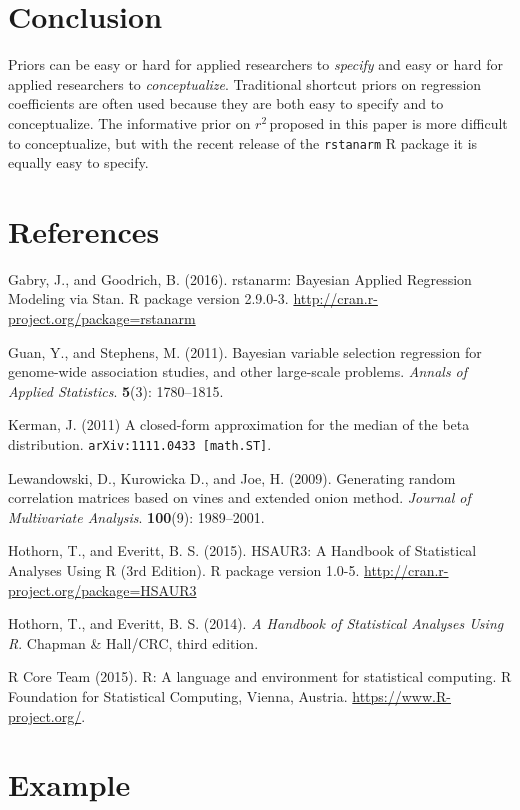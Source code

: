 \documentclass[11pt]{article}
\newcommand{\Rsq}{$r^2\,$}
\begin{document}
\section{Conclusion}

Priors can be easy or hard for applied researchers to \emph{specify} and easy or
hard for applied researchers to \emph{conceptualize}. Traditional shortcut
priors on regression coefficients are often used because they are both easy to
specify and to conceptualize. The informative prior on \Rsq proposed in this
paper is more difficult to conceptualize, but with the recent release of the
{\tt rstanarm} R package it is equally easy to specify.


\section*{References}

\noindent

\bibitem Gabry, J., and Goodrich, B. (2016). rstanarm: Bayesian Applied
Regression Modeling via Stan. R package version 2.9.0-3.
\url{http://cran.r-project.org/package=rstanarm}

\bibitem Guan, Y., and Stephens, M. (2011). Bayesian variable selection
regression for genome-wide association studies, and other large-scale problems.
\emph{Annals of Applied Statistics}. {\bf 5}(3): 1780--1815.

\bibitem Kerman, J. (2011) A closed-form approximation for the median of the
beta distribution. {\tt arXiv:1111.0433 [math.ST]}.

\bibitem Lewandowski, D., Kurowicka D., and Joe, H. (2009). Generating random
correlation matrices based on vines and extended onion method.
\emph{Journal of Multivariate Analysis}. {\bf 100}(9): 1989--2001.

\bibitem Hothorn, T., and Everitt, B. S. (2015).  HSAUR3: A Handbook of
Statistical Analyses Using R (3rd Edition). R package version 1.0-5.
\url{http://cran.r-project.org/package=HSAUR3}

\bibitem Hothorn, T., and Everitt, B. S. (2014). \emph{A Handbook of
Statistical Analyses Using R}. Chapman \& Hall/CRC, third edition.

\bibitem R Core Team (2015). R: A language and environment for statistical
computing. R Foundation for Statistical Computing, Vienna, Austria.
\url{https://www.R-project.org/}.


\appendix
\clearpage
\section{Example}
\end{document}
